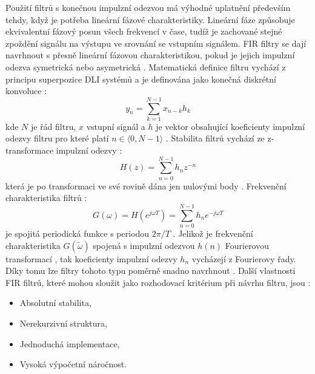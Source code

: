 Použití filtrů s konečnou impulzní odezvou má výhodné uplatnění především tehdy,
když je potřeba lineární fázové charakteristiky. Lineární fáze způsobuje
ekvivalentní fázový posun všech frekvencí v čase, tudíž je zachované stejné
zpoždění signálu na výstupu ve srovnání se vstupním signálem. FIR filtry se dají
navrhnout s přesně lineární fázovou charakteristikou, pokud je jejich impulzní
odezva symetrická nebo asymetrická \cite{Prchal2000}. Matematická definice
filtru vychází z principu superpozice DLI systémů a je definována jako konečná
diskrétní konvoluce \cite{Jan2002}:
\begin{equation}
	\label{eq:conv_fir}
	y_n = \sum_{k=1}^{N-1} x_{n-k} h_k
\end{equation}
kde $N$ je řád filtru, $x$ vstupní signál a $h$ je vektor obsahující koeficienty
impulzní odezvy filtru pro které platí $n \in \langle 0,N-1 \rangle$
\cite{Jan2002}. Stabilita filtrů vychází ze z-transformace impulzní odezvy \cite{Jan2002}:
\begin{equation}
	\label{eq:transfer_fir}
	H(z) = \sum_{n=0}^{N-1} h_n z^{-n}
\end{equation}
která je po transformaci ve své rovině dána jen nulovými body \cite{Jan2002}.
Frekvenční charakteristika filtrů \cite{Jan2002}:
\begin{equation}
	\label{eq:freq_fir}
	G(\omega) = H(e^{j \omega T}) = \sum_{n=0}^{N-1} h_n e^{-j \omega T}
\end{equation}
je spojitá periodická funkce s periodou $2\pi/T$ \cite{Jan2002}. Jelikož je
frekvenční charakteristika $G(\widetilde\omega)$ spojená s impulzní odezvou
$h(n)$ Fourierovou transformací \cite{Prchal2000}, tak koeficienty impulzní
odezvy $h_n$ vycházejí z Fourierovy řady. Díky tomu lze filtry tohoto typu
poměrně snadno navrhnout \cite{Jan2002}. Další vlastnosti FIR filtrů, které
mohou sloužit jako rozhodovací kritérium při návrhu filtru, jsou
\cite{Prchal2000}:
\begin{itemize}[noitemsep]
	\item Absolutní stabilita,
	\item Nerekurzivní struktura,
	\item Jednoduchá implementace,
	\item Vysoká výpočetní náročnost.
\end{itemize}

